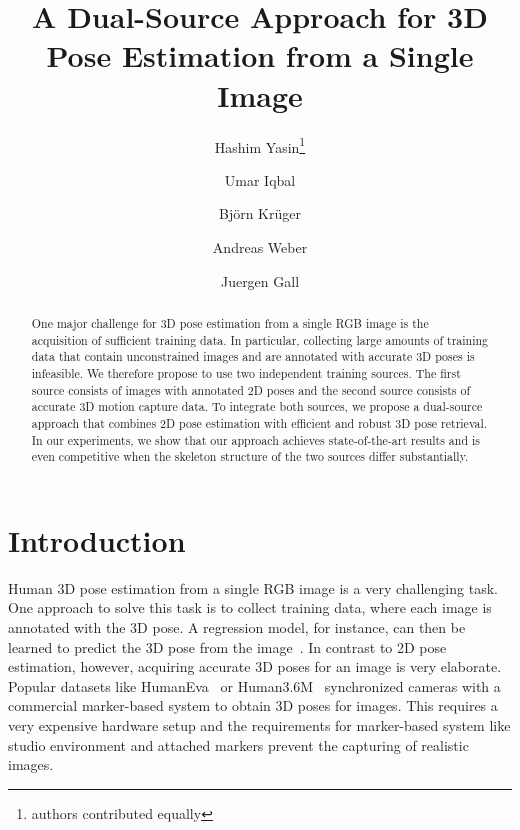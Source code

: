 \documentclass[10pt,twocolumn,letterpaper]{article}
\begin{document}
\title{A Dual-Source Approach for 3D Pose Estimation from a Single Image\vspace{-7mm}}
\newcommand*\samethanks[1][\value{footnote}]{\footnotemark[#1]}

\author[1]{Hashim Yasin\thanks{authors contributed equally}}
\author[2]{Umar Iqbal\samethanks}
\author[3]{Bj{\"o}rn Kr{\"u}ger}
\author[1]{Andreas Weber}
\author[2]{Juergen Gall\vspace{-1mm}}

\maketitle



\begin{abstract}
One major challenge for 3D pose estimation from a single RGB image is the acquisition of sufficient training data. In particular, collecting large amounts of training data that contain unconstrained images and are annotated with accurate 3D poses is infeasible. We therefore propose to use two independent training sources. The first source consists of images with annotated 2D poses and the second source consists of accurate 3D motion capture data. To integrate both sources, we propose a dual-source approach that combines 2D pose estimation with efficient and robust 3D pose retrieval. In our experiments, we show that our approach achieves state-of-the-art results and is even competitive when the skeleton structure of the two sources differ substantially. 
\end{abstract}

\vspace{-4mm}
\section{Introduction}
Human 3D pose estimation from a single RGB image is a very challenging task. One approach to solve this task is to collect  training data, where each image is annotated with the 3D pose. A regression model, for instance, can then be learned to predict the 3D pose from the image~\cite{Bo-2010,Ilya_2014,ics-cvpr14,Agarwal:2006, bo2008fast,LiC14, Sijin2015iccv}. In contrast to 2D pose estimation, however, acquiring accurate 3D poses for an image is very elaborate. Popular datasets like HumanEva~\cite{Sigal_2010} or Human3.6M~\cite{h36m_pami} synchronized cameras with a commercial marker-based system to obtain 3D poses for images. This requires a very expensive hardware setup and the requirements for marker-based system like studio environment and attached markers prevent the capturing of realistic images.
\end{document}
